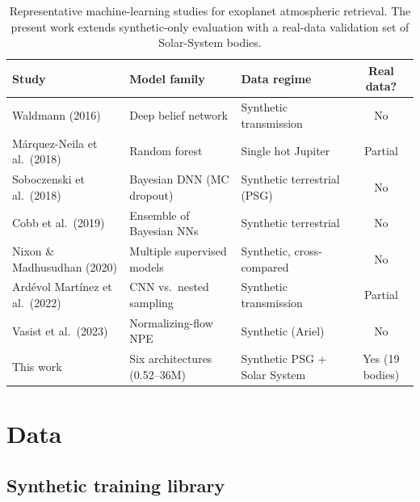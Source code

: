 \documentclass[11pt,twocolumn]{article}
\begin{document}
\begin{table}[t]
\centering
\caption{Representative machine-learning studies for exoplanet atmospheric
retrieval. The present work extends synthetic-only evaluation with a real-data
validation set of Solar-System bodies.}
\label{tab:related}
\small
\begin{tabular}{@{}p{3.8cm}p{4.6cm}p{4.4cm}c@{}}
\toprule
Study & Model family & Data regime & Real data? \\
\midrule
Waldmann (2016) & Deep belief network & Synthetic transmission & No \\
M\'arquez-Neila et al.\ (2018) & Random forest & Single hot Jupiter & Partial \\
Soboczenski et al.\ (2018) & Bayesian DNN (MC dropout) & Synthetic terrestrial (PSG) & No \\
Cobb et al.\ (2019) & Ensemble of Bayesian NNs & Synthetic terrestrial & No \\
Nixon \& Madhusudhan (2020) & Multiple supervised models & Synthetic, cross-compared & No \\
Ard\'evol Mart\'inez et al.\ (2022) & CNN vs.\ nested sampling & Synthetic transmission & Partial \\
Vasist et al.\ (2023) & Normalizing-flow NPE & Synthetic (Ariel) & No \\
This work & Six architectures (0.52--36M) & Synthetic PSG + Solar System & Yes (19 bodies) \\
\bottomrule
\end{tabular}
\end{table}

\section{Data}

\subsection{Synthetic training library}
\end{document}
